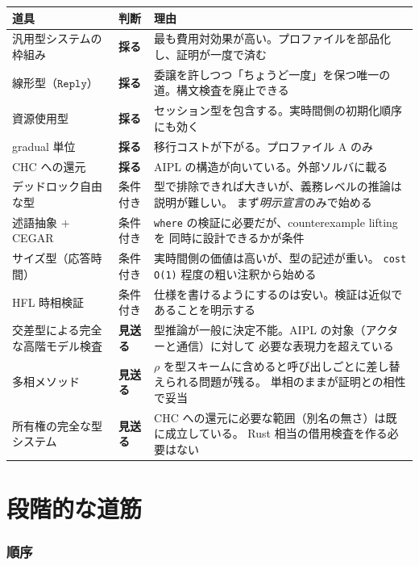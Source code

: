 \documentclass[11pt,a4paper]{ltjsarticle}
\theoremstyle{remark}
\newcommand{\ty}[1]{\ensuremath{\mathtt{#1}}}
\begin{document}
\begin{center}
\small
\begin{longtable}{@{}llp{6.2cm}@{}}
\toprule
道具 & 判断 & 理由 \\
\midrule
\endhead
汎用型システムの枠組み & \textbf{採る} &
  最も費用対効果が高い。プロファイルを部品化し、証明が一度で済む \\
線形型（\ty{Reply}） & \textbf{採る} &
  委譲を許しつつ「ちょうど一度」を保つ唯一の道。構文検査を廃止できる \\
資源使用型 & \textbf{採る} &
  セッション型を包含する。実時間側の初期化順序にも効く \\
gradual 単位 & \textbf{採る} &
  移行コストが下がる。プロファイル A のみ \\
CHC への還元 & \textbf{採る} &
  AIPL の構造が向いている。外部ソルバに載る \\
\midrule
デッドロック自由な型 & 条件付き &
  型で排除できれば大きいが、義務レベルの推論は説明が難しい。
  まず\emph{明示宣言}のみで始める \\
述語抽象 $+$ CEGAR & 条件付き &
  \texttt{where} の検証に必要だが、counterexample lifting を
  同時に設計できるかが条件 \\
サイズ型（応答時間） & 条件付き &
  実時間側の価値は高いが、型の記述が重い。
  \texttt{cost O(1)} 程度の粗い注釈から始める \\
HFL 時相検証 & 条件付き &
  仕様を書けるようにするのは安い。検証は近似であることを明示する \\
\midrule
交差型による完全な高階モデル検査 & \textbf{見送る} &
  型推論が一般に決定不能。AIPL の対象（アクターと通信）に対して
  必要な表現力を超えている \\
多相メソッド & \textbf{見送る} &
  $\rho$ を型スキームに含めると呼び出しごとに差し替えられる問題が残る。
  単相のままが証明との相性で妥当 \\
所有権の完全な型システム & \textbf{見送る} &
  CHC への還元に必要な範囲（別名の無さ）は既に成立している。
  Rust 相当の借用検査を作る必要はない \\
\bottomrule
\end{longtable}
\end{center}

\part{段階的な道筋}

\section{順序}
\end{document}
